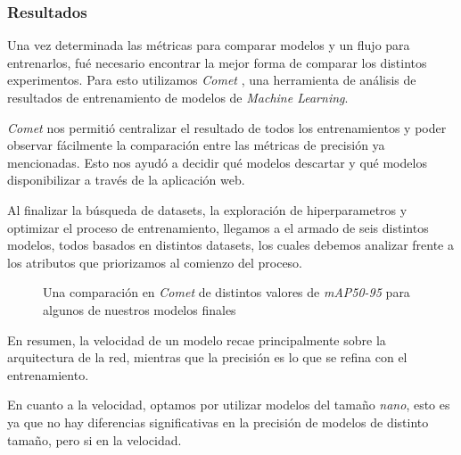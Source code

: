 \documentclass[a4paper]{article}
\begin{document}
\subsubsection{Resultados}

Una vez determinada las métricas para comparar modelos y un flujo para entrenarlos, fué necesario encontrar la mejor forma de comparar los distintos experimentos. Para esto utilizamos \textit{Comet} \cite{comet}, una herramienta de análisis de resultados de entrenamiento de modelos de \textit{Machine Learning}.

\textit{Comet} nos permitió centralizar el resultado de todos los entrenamientos y poder observar fácilmente la comparación entre las métricas de precisión ya mencionadas. Esto nos ayudó a decidir qué modelos descartar y qué modelos disponibilizar a través de la aplicación web.

Al finalizar la búsqueda de datasets, la exploración de hiperparametros y optimizar el proceso de entrenamiento, llegamos a el armado de seis distintos modelos, todos basados en distintos datasets, los cuales debemos analizar frente a los atributos que priorizamos al comienzo del proceso.

\begin{figure}[H]
\caption{Una comparación en \textit{Comet} de distintos valores de \textit{mAP50-95} para algunos de nuestros modelos finales}
\end{figure}

En resumen, la velocidad de un modelo recae principalmente sobre la arquitectura de la red, mientras que la precisión es lo que se refina con el entrenamiento.

En cuanto a la velocidad, optamos por utilizar modelos del tamaño \textit{nano}, esto es ya que no hay diferencias significativas en la precisión de modelos de distinto tamaño, pero si en la velocidad.
\end{document}
